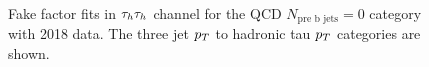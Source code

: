 \begin{figure}[!hbtp]
\centering
     \\
\caption{Fake factor fits in $\tau_{h}\tau_{h}$ channel for the QCD $N_{\text{pre b jets}}=0$ category with 2018 data. The three jet $p_{T}$ to hadronic tau $p_{T}$ categories are shown.}
\label{fig:tt_ff_fit}
\end{figure}

